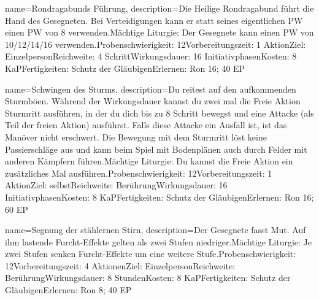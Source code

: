 {
    name={Rondragabunds Führung},
    description={Die Heilige Rondragabund führt die Hand des Gesegneten. Bei Verteidigungen kann er statt seines eigentlichen PW einen PW von 8 verwenden.\newline Mächtige Liturgie: Der Gesegnete kann einen PW von 10/12/14/16 verwenden.\newline Probenschwierigkeit: 12\newline Vorbereitungszeit: 1 Aktion\newline Ziel: Einzelperson\newline Reichweite: 4 Schritt\newline Wirkungsdauer: 16 Initiativphasen\newline Kosten: 8 KaP\newline Fertigkeiten: Schutz der Gläubigen\newline Erlernen: Ron 16; 40 EP}
}


{
    name={Schwingen des Sturms},
    description={Du reitest auf den aufkommenden Sturmböen. Während der Wirkungsdauer kannst du zwei mal die Freie Aktion Sturmritt ausführen, in der du dich bis zu 8 Schritt bewegst und eine Attacke (als Teil der freien Aktion) ausführst. Falls diese Attacke ein Ausfall ist, ist das Manöver nicht erschwert. Die Bewegung mit dem Sturmritt löst keine Passierschläge aus und kann beim Spiel mit Bodenplänen auch durch Felder mit anderen Kämpfern führen.\newline Mächtige Liturgie: Du kannst die Freie Aktion ein zusätzliches Mal ausführen.\newline Probenschwierigkeit: 12\newline Vorbereitungszeit: 1 Aktion\newline Ziel: selbst\newline Reichweite: Berührung\newline Wirkungsdauer: 16 Initiativphasen\newline Kosten: 8 KaP\newline Fertigkeiten: Schutz der Gläubigen\newline Erlernen: Ron 16; 60 EP}
}


{
    name={Segnung der stählernen Stirn},
    description={Der Gesegnete fasst Mut. Auf ihm lastende Furcht-Effekte gelten als zwei Stufen niedriger.\newline Mächtige Liturgie: Je zwei Stufen senken Furcht-Effekte um eine weitere Stufe.\newline Probenschwierigkeit: 12\newline Vorbereitungszeit: 4 Aktionen\newline Ziel: Einzelperson\newline Reichweite: Berührung\newline Wirkungsdauer: 8 Stunden\newline Kosten: 8 KaP\newline Fertigkeiten: Schutz der Gläubigen\newline Erlernen: Ron 8; 40 EP}
}



